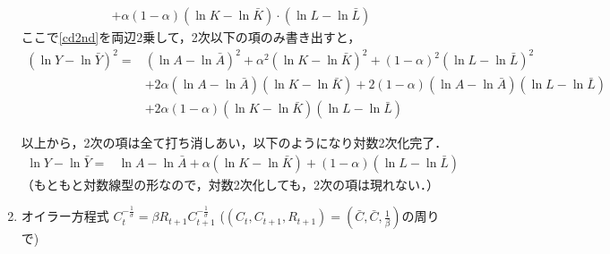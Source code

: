 \documentclass[a4paper,12pt,onecolumn,oneside,notitlepage,final]{article}
\begin{document}
\begin{enumerate}
\begin{align}
&+ \alpha (1-\alpha) (\ln K - \ln \bar K) \cdot (\ln L - \ln \bar L) \label{cd2nd}
\end{align}
ここで\eqref{cd2nd}を両辺2乗して，2次以下の項のみ書き出すと，
\begin{align*}
(\ln Y - \ln \bar Y)^2 = &(\ln A - \ln \bar A)^2 + \alpha^2 (\ln K - \ln \bar K)^2 + (1-\alpha)^2(\ln L - \ln \bar L)^2 \\
&+ 2\alpha (\ln A - \ln \bar A) (\ln K - \ln \bar K) + 2(1-\alpha) (\ln A - \ln \bar A) (\ln L - \ln \bar L) \\
&+ 2\alpha(1-\alpha) (\ln K - \ln \bar K) (\ln L - \ln \bar L)
\end{align*}

以上から，2次の項は全て打ち消しあい，以下のようになり対数2次化完了．
\begin{align*}
\ln Y - \ln \bar Y = &\ln A - \ln \bar A + \alpha (\ln K - \ln \bar K) + (1-\alpha) (\ln L - \ln \bar L)
\end{align*}
（もともと対数線型の形なので，対数2次化しても，2次の項は現れない．）


\item オイラー方程式 $C_t^{-\frac{1}{\sigma}} = \beta R_{t+1} C_{t+1}^{-\frac{1}{\sigma}}$ \quad ($(C_t, C_{t+1}, R_{t+1}) = (\bar C, \bar C, \frac{1}{\beta})$の周りで)\\


\end{enumerate}
\end{document}
